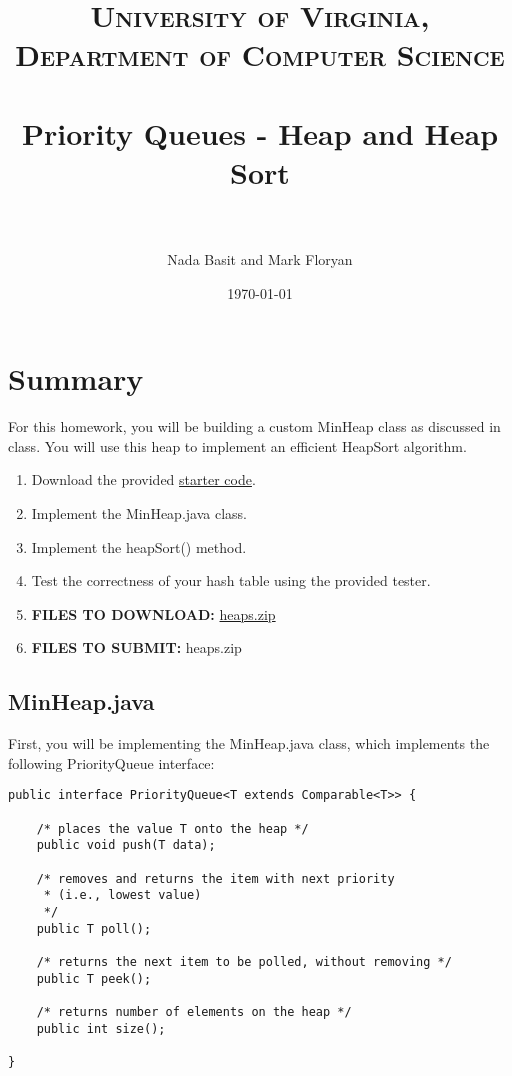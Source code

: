 \documentclass[paper=a4, fontsize=11pt, parskip=full]{scrartcl} %
\title{
\normalfont \normalsize
\textsc{University of Virginia, Department of Computer Science} \\ [25pt] %
\horrule{0.5pt} \\[0.4cm] %
\huge Priority Queues - Heap and Heap Sort \\ %
\horrule{2pt} \\[0.5cm] %
}
\author{Nada Basit and Mark Floryan}
\date{\normalsize\today} %
\numberwithin{equation}{section} %
\numberwithin{figure}{section} %
\numberwithin{table}{section} %
\begin{document}
\maketitle %


\section{Summary}

For this homework, you will be building a custom MinHeap class as discussed in class. You will use this heap to implement an efficient HeapSort algorithm. 

\begin{enumerate}
	\item Download the provided \href{https://uva-cs.github.io/dsa1/homeworks/PriorityQueues/code/heaps.zip}{starter code}.
	\item Implement the MinHeap.java class.
	\item Implement the heapSort() method.
	\item Test the correctness of your hash table using the provided tester.
	\item \textbf{FILES TO DOWNLOAD:} \href{https://uva-cs.github.io/dsa1/homeworks/PriorityQueues/code/heaps.zip}{heaps.zip}
	\item \textbf{FILES TO SUBMIT:} heaps.zip
\end{enumerate}


\subsection{MinHeap.java}

First, you will be implementing the MinHeap.java class, which implements the following PriorityQueue interface:

\begin{lstlisting}
public interface PriorityQueue<T extends Comparable<T>> {
	
	/* places the value T onto the heap */
	public void push(T data);

	/* removes and returns the item with next priority
     * (i.e., lowest value)
	 */
	public T poll();

	/* returns the next item to be polled, without removing */
	public T peek();

	/* returns number of elements on the heap */
	public int size();
	
}

\end{lstlisting}
\end{document}
